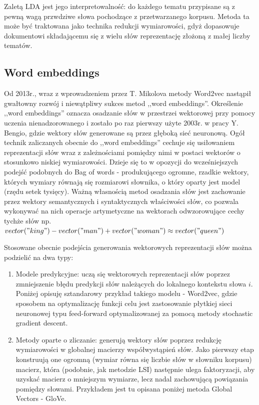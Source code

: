 \documentclass[pl]{minipw} %
\begin{document}
Zaletą LDA jest jego interpretowalność: do każdego tematu przypisane są z pewną wagą przwdziwe słowa pochodzące z przetwarzanego korpusu. Metoda ta może być traktowana jako technika redukcji wymiarowości, gdyż dopasowuje dokumentowi składającemu się z wielu słów reprezentację złożoną z małej liczby tematów.


\subsection{Word embeddings}
Od 2013r., wraz z wprowadzeniem przez T. Mikolova metody Word2vec\cite{word2vec} nastąpił gwałtowny rozwój i niewątpliwy sukces metod ,,word embeddings''. Określenie ,,word embeddings'' oznacza osadzanie słów w przestrzei wektorowej przy pomocy uczenia nienadzorowanego i zostało po raz pierwszy użyte 2003r. w pracy Y. Bengio\cite{bengio}, gdzie wektory słów generowane są przez głęboką sieć neuronową. Ogół technik zaliczanych obecnie do ,,word embeddings'' cechuje się usiłowaniem reprezentacji słów wraz z zależnościami pomiędzy nimi w postaci wektorów o stosunkowo niskiej wymiarowości. Dzieje się to w opozycji do wcześniejszych podejść podobnych do Bag of words - produkującego ogromne, rzadkie wektory, których wymiary równają się rozmiarowi słownika, o który oparty jest model (rzędu setek tysięcy). Ważną własnością metod osadzania słów jest zachowanie przez wektory semantycznych i syntaktycznych właściwości słów, co pozwala wykonywać na nich operacje artymetyczne na wektorach odwzorowujące cechy tychże słów np. $vector("king")-vector("man")+vector("woman") \approx vector("queen")$ 

Stosowane obecnie podejścia generowania wektorowych reprezentacji słów można podzielić na dwa typy:
\begin{enumerate}
	\item Modele predykcyjne: uczą się wektorowych reprezentacji słów poprzez zmniejszenie błędu predykcji słów należących do lokalnego kontekstu słowa $i$. Poniżej opisuję sztandarowy przykład takiego modelu - Word2vec, gdzie sposobem na optymalizację funkcji celu jest zastosowanie płytkiej sieci neuronowej typu feed-forward optymalizowanej za pomocą metody stochastic gradient descent.
	\item Metody oparte o zliczanie: generują wektory słów poprzez redukcję wymiarowości w globalnej macierzy współwystąpień słów.
	Jako pierwszy etap konstruują one ogromną (wymiar równa się liczbie słów w słowniku korpusu) macierz, która (podobnie, jak  metodzie LSI) następnie ulega faktoryzacji, aby uzyskać macierz o mniejszym wymiarze, lecz nadal zachowującą powiązania pomiędzy słowami. Przykładem jest tu opisana poniżej metoda Global Vectors - GloVe.
\end{enumerate}
\end{document}
